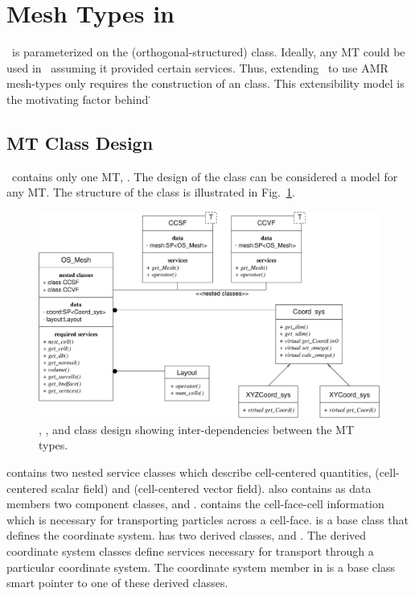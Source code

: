 
\section{Mesh Types in }

\imctest\ is parameterized on the  (orthogonal-structured) 
class.  Ideally, any MT could be used in \imctest\ assuming it provided 
certain services.  Thus, extending \imctest\ to use AMR mesh-types only 
requires the construction of an  class.  This
extensibility model is the motivating factor behind \draco\.

\subsection{MT Class Design}

\imctest\ contains only one MT, .  The design of the
 class can be considered a model for any MT.  The
structure of the  class is illustrated in
Fig.~\ref{fig:os_mesh}.
\begin{figure}
\centerline{
\includegraphics[width=6in]{os_mesh.eps}}
\caption{, , and  class
  design showing inter-dependencies between the MT types.}
\label{fig:os_mesh}
\end{figure}
 contains two nested service classes which describe
cell-centered quantities,  (cell-centered scalar field) and
 (cell-centered vector field).   also
contains as data members two component classes,  and
.   contains the cell-face-cell
information which is necessary for transporting particles across a
cell-face.   is a base class that defines the
coordinate system.   has two derived classes,
 and .  The derived coordinate
system classes define services necessary for transport through a
particular coordinate system.  The coordinate system member in
 is a base class smart pointer to one of these derived
classes.

